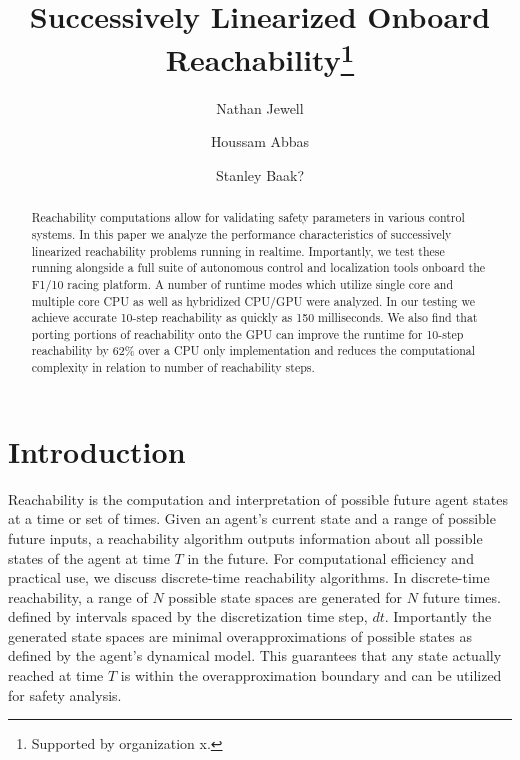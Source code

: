 \documentclass[runningheads]{llncs}
\begin{document}
%
\title{Successively Linearized Onboard Reachability\thanks{Supported by organization x.}}
%
%
\author{Nathan Jewell \and
Houssam Abbas \and
Stanley Baak?}
%
%
%
\maketitle              %
%
\begin{abstract}
Reachability computations allow for validating safety parameters in various control systems. In this paper we analyze the performance characteristics of successively linearized reachability problems running in realtime. Importantly, we test these running alongside a full suite of autonomous control and localization tools onboard the F1/10 racing platform. A number of runtime modes which utilize single core and multiple core CPU as well as hybridized CPU/GPU were analyzed. In our testing we achieve accurate 10-step reachability as quickly as 150 milliseconds. We also find that porting portions of reachability onto the GPU can improve the runtime for 10-step reachability by 62\% over a CPU only implementation and reduces the computational complexity in relation to number of reachability steps.

\end{abstract}
%
%
%
\section{Introduction}
Reachability is the computation and interpretation of possible future agent states at a time or set of times. Given an agent's current state and a range of possible future inputs, a reachability algorithm outputs information about all possible states of the agent at time $T$ in the future. For computational efficiency and practical use, we discuss discrete-time reachability algorithms. In discrete-time reachability, a range of $N$ possible state spaces are generated for $N$ future times. defined by intervals spaced by the discretization time step, $dt$. Importantly the generated state spaces are minimal overapproximations of possible states as defined by the agent’s dynamical model. This guarantees that any state actually reached at time $T$ is within the overapproximation boundary and can be utilized for safety analysis.
\end{document}
